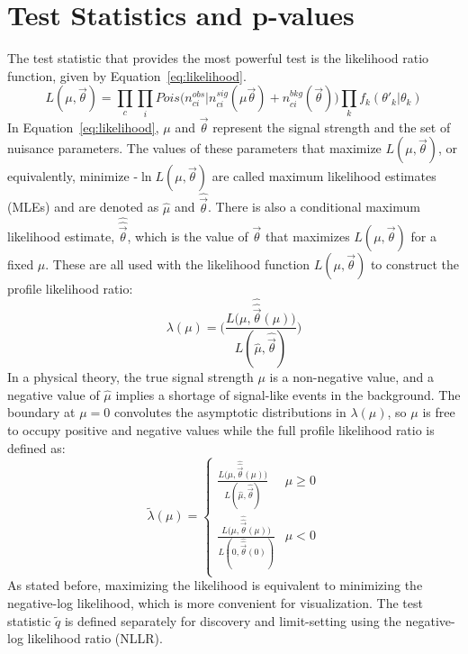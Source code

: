 \section{Test Statistics and p-values}
\label{sec:statanal:pval}
The test statistic that provides the most powerful test is the likelihood ratio function, given by Equation~\ref{eq:likelihood}.
\begin{equation}
L(\mu,\vec{\theta})=\prod_c\prod_iPois\big(n_{ci}^{obs}|n_{ci}^{sig}(\mu\vec{\theta})+n_{ci}^{bkg}(\vec{\theta})\big)\prod_kf_k(\theta'_k|\theta_k)
\label{eq:likelihood}
\end{equation}
In Equation~\ref{eq:likelihood}, $\mu$ and $\vec{\theta}$ represent the signal strength and the set of nuisance parameters.  The values of these parameters that maximize $L(\mu,\vec{\theta})$, or equivalently, minimize -$\ln L(\mu,\vec{\theta})$ are called maximum likelihood estimates (MLEs) and are denoted as $\hat{\mu}$ and $\hat{\vec{\theta}}$.  There is also a conditional maximum likelihood estimate, $\hat{\hat{\vec{\theta}}}$, which is the value of $\vec{\theta}$ that maximizes $L(\mu,\vec{\theta})$ for a fixed $\mu$.  These are all used with the likelihood function $L(\mu,\vec{\theta})$ to construct the profile likelihood ratio:
\begin{equation}
\lambda(\mu)=\bigg(\frac{L\big(\mu,\hat{\hat{\vec{\theta}}}(\mu)\big)}{L(\hat{\mu},\hat{\vec{\theta}})}\bigg)
\end{equation}
In a physical theory, the true signal strength $\mu$ is a non-negative value, and a negative value of $\hat{\mu}$ implies a shortage of signal-like events in the background.  The boundary at $\mu=0$ convolutes the asymptotic distributions in $\lambda(\mu)$, so $\mu$ is free to occupy positive and negative values while the full profile likelihood ratio is defined as:
\begin{equation}
\tilde{\lambda}(\mu)=
 \begin{cases} 
      \frac{L\big(\mu,\hat{\hat{\vec{\theta}}}(\mu)\big)}{L(\hat{\mu},\hat{\vec{\theta}})} & \hat{\mu}\geq 0 \\
      \frac{L\big(\mu,\hat{\hat{\vec{\theta}}}(\mu)\big)}{L(0,\hat{\hat{\vec{\theta}}}(0))} & \hat{\mu}< 0 \\
   \end{cases}
\end{equation}
As stated before, maximizing the likelihood is equivalent to minimizing the negative-log likelihood, which is more convenient for visualization.  The test statistic $\tilde{q}$ is defined separately for discovery and limit-setting using the negative-log likelihood ratio (NLLR).  

